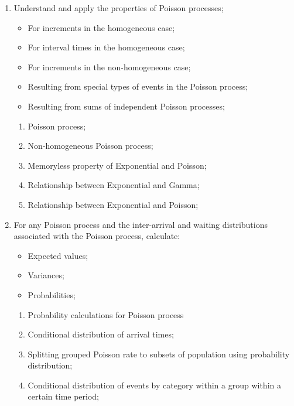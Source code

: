 \begin{outcomes}
\begin{enumerate}
	\item	Understand and apply the properties of Poisson processes;
		\begin{itemize}
		\item	For increments in the homogeneous case;
		\item	For interval times in the homogeneous case;
		\item	For increments in the non-homogeneous case;
		\item	Resulting from special types of events in the Poisson process;
		\item	Resulting from sums of independent Poisson processes;
		\end{itemize}
	\begin{knowledge}
	\begin{enumerate}[label = \alph*.]
		\item	Poisson process;
		\item	Non-homogeneous Poisson process;
		\item	Memoryless property of Exponential and Poisson;
		\item	Relationship between Exponential and Gamma;
		\item	Relationship between Exponential and Poisson;
	\end{enumerate}
	\end{knowledge}
\tcbline
	\item	For any Poisson process and the inter-arrival and waiting distributions associated with the Poisson process, calculate:
		\begin{itemize}
		\item	Expected values;
		\item	Variances;
		\item	Probabilities;
		\end{itemize}
	\begin{knowledge}
	\begin{enumerate}[label = \alph*.]
		\item	Probability calculations for Poisson process
		\item	Conditional distribution of arrival times;
		\item	Splitting grouped Poisson rate to subsets of population using probability distribution;
		\item	Conditional distribution of events by category within a group within a certain time period;

\end{enumerate}
\end{knowledge}
\end{enumerate}
\end{outcomes}
